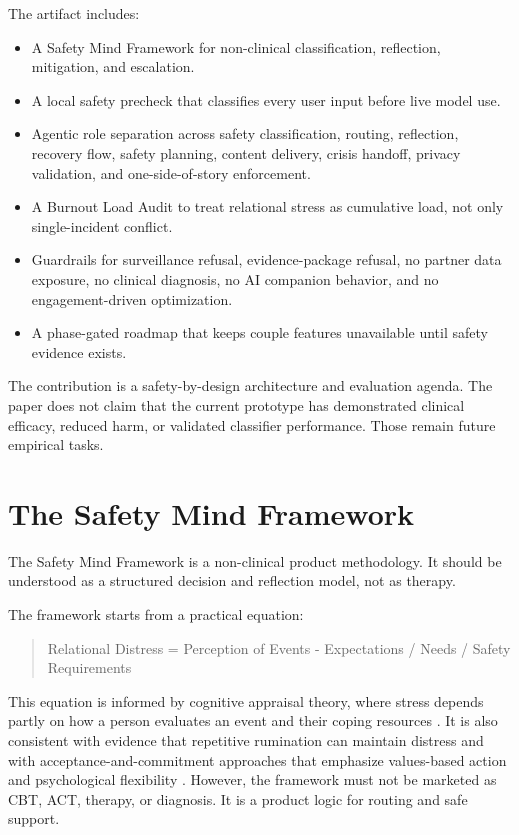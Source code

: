 \documentclass[11pt]{article}
\begin{document}
The artifact includes:

\begin{itemize}
  \item A Safety Mind Framework for non-clinical classification, reflection, mitigation, and escalation.
  \item A local safety precheck that classifies every user input before live model use.
  \item Agentic role separation across safety classification, routing, reflection, recovery flow, safety planning, content delivery, crisis handoff, privacy validation, and one-side-of-story enforcement.
  \item A Burnout Load Audit to treat relational stress as cumulative load, not only single-incident conflict.
  \item Guardrails for surveillance refusal, evidence-package refusal, no partner data exposure, no clinical diagnosis, no AI companion behavior, and no engagement-driven optimization.
  \item A phase-gated roadmap that keeps couple features unavailable until safety evidence exists.
\end{itemize}

The contribution is a safety-by-design architecture and evaluation agenda. The paper does not claim that the current prototype has demonstrated clinical efficacy, reduced harm, or validated classifier performance. Those remain future empirical tasks.

\section{The Safety Mind Framework}

The Safety Mind Framework is a non-clinical product methodology. It should be understood as a structured decision and reflection model, not as therapy.

The framework starts from a practical equation:

\begin{quote}
Relational Distress = Perception of Events - Expectations / Needs / Safety Requirements
\end{quote}

This equation is informed by cognitive appraisal theory, where stress depends partly on how a person evaluates an event and their coping resources \citep{lazarus1984}. It is also consistent with evidence that repetitive rumination can maintain distress \citep{nolenhoeksema2008} and with acceptance-and-commitment approaches that emphasize values-based action and psychological flexibility \citep{hayes2006}. However, the framework must not be marketed as CBT, ACT, therapy, or diagnosis. It is a product logic for routing and safe support.
\end{document}
